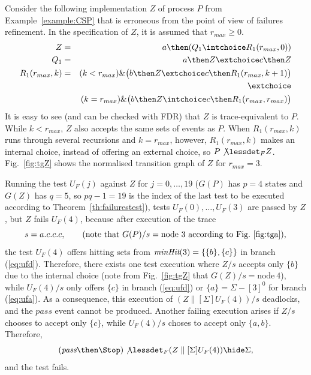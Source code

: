 \begin{example}
\label{ex:uf1tests} Consider the following implementation $Z$ of process $P$
from Example~\ref{example:CSP} that is erroneous from the point of view of
failures refinement. In the specification of $Z$, it is assumed that $r_{max}\ge 0$. 
\begin{eqnarray*}
Z & = & a \then (Q_1 \intchoice R_1(r_{max},0))
\\
Q_1 & = & a\then Z \extchoice c\then Z
\\
R_1(r_{max},k) & = & (k < r_{max}) \& \big(b\then Z \extchoice  c\then R_1(r_{max},k+1)\big)
\\ & & \extchoice
\\ & & (k = r_{max}) \& \big(b\then Z \intchoice c\then R_1(r_{max},r_{max})\big)
\end{eqnarray*}
It is easy to see (and can be checked with FDR) that $Z$ is trace-equivalent
to $P$. While $k < r_{max}$, $Z$ also accepts the same sets of events as $P$.
When $R_1(r_{max},k)$ runs through several recursions and $k = r_{max}$,
however, $R_1(r_{max},k)$ makes an internal choice, instead of offering an
external choice, so $P\not\lessdet_F Z$. Fig.~\ref{fig:tgZ} shows the
normalised transition graph of $Z$ for $r_{max} = 3$.
 

Running the test $U_F(j)$ against $Z$ for $j=0,\dots,19$ ($G(P)$ has $p = 4$
states and $G(Z)$ has $q=5$, so $pq-1=19$ is the index of the last test to 
be executed  according to Theorem~\ref{th:failurestest}), tests $U_F(0),\dots,
U_F(3)$ are passed by $Z$, but $Z$ fails $U_F(4)$, because after execution of
the trace
\[
s = a.c.c.c, \qquad\text{(note that $G(P)/s = \text{node}\ 3$ according to Fig.~\ref{fig:tga})},
\]
the test $U_F(4)$ offers hitting sets from $\text{\it minHit}(3) = \{\{b\},\{c\}\}$
in branch (\ref{eq:ufd}). Therefore,  there exists one test execution
where $Z/s$ accepts only $\{b\}$ due to the internal choice (note
from Fig.~\ref{fig:tgZ} that
$G(Z)/s = \text{node}\ 4$), while $U_F(4)/s$
only offers $\{c\}$ in branch (\ref{eq:ufd}) or $\{ a\} = \Sigma - [3]^0$ for
branch (\ref{eq:ufa}).  As a consequence, this execution of
$(Z\parallel[\Sigma] U_F(4))/s$ deadlocks, and the $pass$ event cannot be
produced. Another failing execution arises if $Z/s$ chooses to accept only
$\{c \}$, while $U_F(4)/s$ choses to accept only $\{a,b\}$. Therefore,
\[
(\epass\then \Stop)\not\lessdet_F  (Z\parallel[\Sigma] U_F(4)) \hide\Sigma,
\]
and the test fails. \xbox
\end{example}
 
